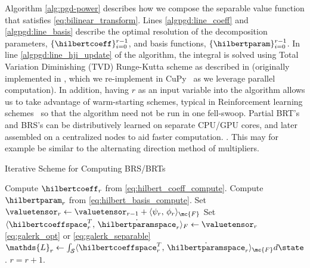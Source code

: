 Algorithm \ref{alg:pgd-power} describes how we  compose the separable value function that satisfies \eqref{eq:bilinear_transform}. Lines \ref{algpgd:line_coeff} and \ref{algpgd:line_basis} 
describe the optimal resolution of the decomposition parameters, $\{\hilbertcoeff\}_{i=0}^{r-1}$, and basis functions, $\{\hilbertparam\}_{i=0}^{r-1}$. In line \ref{algpgd:line_hji_update} of the algorithm, the integral is solved using Total Variation Diminishing (TVD) Runge-Kutta scheme as described in \cite[\S3.5]{LevelSetsBook} (originally implemented in \cite{MitchellLSToolbox2007}, which we re-implement in CuPy~\cite{CuPy} as we leverage parallel computation). In addition, having $r$ as an input variable into the algorithm allows us to take advantage of warm-starting schemes, typical in Reinforcement learning schemes~\cite{FisacICRA} so that the algorithm need not be run in one fell-swoop. Partial BRT's and BRS's can be distributively learned on separate CPU/GPU cores, and later assembled on a centralized nodes to aid faster computation. .
This may for example be similar to the alternating direction method of multipliers.

\begin{algorithm}[tb!]
	\caption{Iterative Scheme for Computing BRS/BRTs  
		\label{alg:pgd-power}}
	\begin{algorithmic}[1]
		\State Compute $\hilbertcoeff_r$ from \eqref{eq:hilbert_coeff_compute}. %
		\label{algpgd:line_coeff}
		\State Compute $\hilbertparam_r$ from \eqref{eq:hilbert_basis_compute}. %
		\label{algpgd:line_basis}
		\State Set $\valuetensor_r \leftarrow  \valuetensor_{r-1} + \langle\psi_r,\, \phi_r \rangle_{\mc{F}}$
		\State Set $\langle \hilbertcoeffspace_r^T, \, \dot{\hilbertparamspace}_r \rangle_F \leftarrow \valuetensor_r$  \cf \eqref{eq:galerk_opt} or  \eqref{eq:galerk_separable}
		\label{algpgd:line_hji_update}
		\State $\mathds{L}_r \leftarrow \int_{\mathcal{S}} \langle \hilbertcoeffspace_r^T, \, \dot{\hilbertparamspace}_r \rangle_{\mc{F}} d\state$. 
		\State $r = r+1$.
		\EndWhile
		\State {}
		\EndFunction
	\end{algorithmic}
\end{algorithm}


